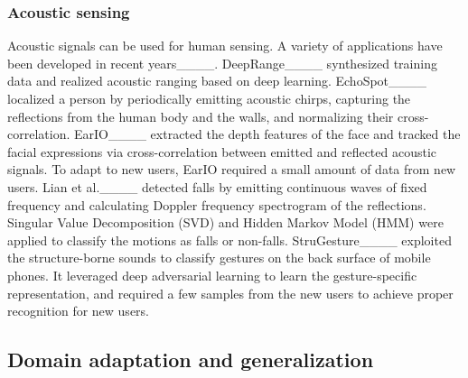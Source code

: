 \subsubsection{Acoustic sensing}
Acoustic signals can be used for human sensing. A variety of applications have been developed in recent years____. 
DeepRange____ synthesized training data and realized acoustic ranging based on deep learning. 
EchoSpot____ localized a person by periodically emitting acoustic chirps, capturing the reflections from the human body and the walls, and normalizing their cross-correlation. 
EarIO____ extracted the depth features of the face and tracked the facial expressions via cross-correlation between emitted and reflected acoustic signals. To adapt to new users, EarIO required a small amount of data from new users.
Lian et al.____ detected falls by emitting continuous waves of fixed frequency and calculating Doppler frequency spectrogram of the reflections. Singular Value Decomposition (SVD) and Hidden Markov Model (HMM) were applied to classify the motions as falls or non-falls. 
StruGesture____ exploited the structure-borne sounds to classify gestures on the back surface of mobile phones. It leveraged deep adversarial learning to learn the gesture-specific representation, and required a few samples from the new users to achieve proper recognition for new users.

\subsection{Domain adaptation and generalization}
